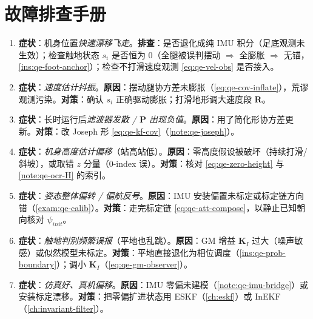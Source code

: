 \section*{故障排查手册}
\begin{enumerate}
  \item \textbf{症状}：机身位置\emph{快速漂移飞走}。\textbf{排查}：是否退化成纯 IMU 积分（足底观测未生效）；检查触地状态 $s_i$ 是否恒为 $0$（全腿被误判摆动 $\Rightarrow$ 全膨胀 $\Rightarrow$ 无锚，\cref{ins:qe-foot-anchor}）；检查不打滑速度观测 \cref{eq:qe-vel-obs} 是否接入。
  \item \textbf{症状}：\emph{速度估计抖振}。\textbf{原因}：摆动腿协方差未膨胀（\cref{eq:qe-cov-inflate}），荒谬观测污染。\textbf{对策}：确认 $s_i$ 正确驱动膨胀；打滑地形调大速度段 $\mathbf{R}$。
  \item \textbf{症状}：长时运行后\emph{滤波器发散 / $\mathbf{P}$ 出现负值}。\textbf{原因}：用了简化形协方差更新。\textbf{对策}：改 Joseph 形 \cref{eq:qe-kf-cov}（\cref{note:qe-joseph}）。
  \item \textbf{症状}：\emph{机身高度估计偏移}（站高站低）。\textbf{原因}：零高度假设被破坏（持续打滑/斜坡），或取错 $z$ 分量（$0$-index 误）。\textbf{对策}：核对 \cref{eq:qe-zero-height} 与 \cref{note:qe-ocr-H} 的索引。
  \item \textbf{症状}：\emph{姿态整体偏转 / 偏航反号}。\textbf{原因}：IMU 安装偏置未标定或标定链方向错（\cref{exam:qe-calib}）。\textbf{对策}：走完标定链 \cref{eq:qe-att-compose}，以静止已知朝向核对 $\psi_{init}$。
  \item \textbf{症状}：\emph{触地判别频繁误报}（平地也乱跳）。\textbf{原因}：GM 增益 $\mathbf{K}_I$ 过大（噪声敏感）或似然模型未标定。\textbf{对策}：平地直接退化为相位调度（\cref{ins:qe-prob-boundary}）；调小 $\mathbf{K}_I$（\cref{eq:qe-gm-observer}）。
  \item \textbf{症状}：\emph{仿真好、真机偏移}。\textbf{原因}：IMU 零偏未建模（\cref{note:qe-imu-bridge}）或安装标定漂移。\textbf{对策}：把零偏扩进状态用 ESKF（\cref{ch:eskf}）或 InEKF（\cref{ch:invariant-filter}）。
\end{enumerate}
